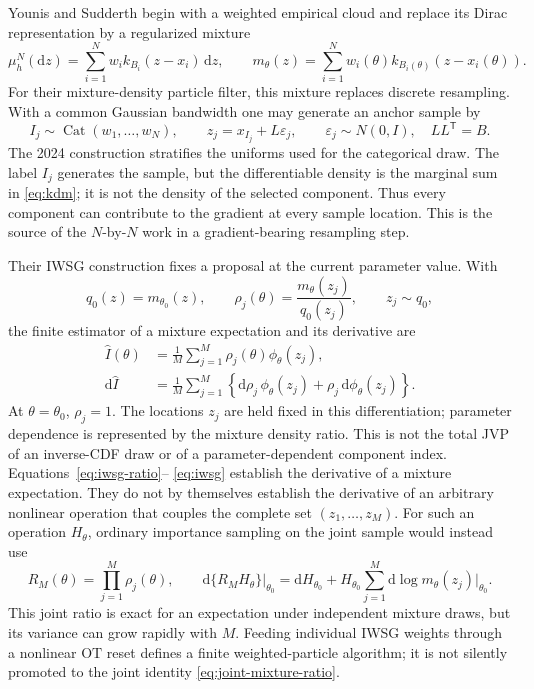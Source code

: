 \documentclass[11pt]{article}
\newcommand{\dd}{\mathrm{d}}
\newcommand{\OT}{\ensuremath{\mathrm{OT}}}
\begin{document}
Younis and Sudderth begin with a weighted empirical cloud and replace its
Dirac representation by a regularized mixture
\begin{equation}
 \mu_h^N(\dd z)
   = \sum_{i=1}^{N} w_i k_{B_i}(z-x_i)\,\dd z,
 \qquad
 m_\theta(z)=\sum_{i=1}^{N}
       w_i(\theta)k_{B_i(\theta)}(z-x_i(\theta)).
 \label{eq:kdm}
\end{equation}
For their mixture-density particle filter, this mixture replaces discrete
resampling.  With a common Gaussian bandwidth one may generate an anchor
sample by
\begin{equation}
 I_j\sim\operatorname{Cat}(w_1,\ldots,w_N),\qquad
 z_j=x_{I_j}+L\varepsilon_j,\qquad
 \varepsilon_j\sim N(0,I),\quad LL^\mathsf{T}=B.
 \label{eq:younis-sampling}
\end{equation}
The 2024 construction stratifies the uniforms used for the categorical draw.
The label $I_j$ generates the sample, but the differentiable density is the
marginal sum in \eqref{eq:kdm}; it is not the density of the selected
component.  Thus every component can contribute to the gradient at every
sample location.  This is the source of the $N$-by-$N$ work in a
gradient-bearing resampling step.

Their IWSG construction fixes a proposal at the current parameter value.  With
\begin{equation}
 q_0(z)=m_{\theta_0}(z),\qquad
 \rho_j(\theta)=\frac{m_\theta(z_j)}{q_0(z_j)},\qquad
 z_j\sim q_0,
 \label{eq:iwsg-ratio}
\end{equation}
the finite estimator of a mixture expectation and its derivative are
\begin{align}
 \widehat I(\theta)
   &=\frac{1}{M}\sum_{j=1}^{M}\rho_j(\theta)\phi_\theta(z_j),\\
 \dd\widehat I
   &=\frac{1}{M}\sum_{j=1}^{M}
       \left\{\dd\rho_j\,\phi_\theta(z_j)
              +\rho_j\,\dd\phi_\theta(z_j)\right\}.
 \label{eq:iwsg}
\end{align}
At $\theta=\theta_0$, $\rho_j=1$.  The locations $z_j$ are held fixed in
this differentiation; parameter dependence is represented by the mixture
density ratio.  This is not the total JVP of an inverse-CDF draw or of a
parameter-dependent component index.  Equations~\eqref{eq:iwsg-ratio}--
\eqref{eq:iwsg} establish the derivative of a mixture expectation.  They do
not by themselves establish the derivative of an arbitrary nonlinear
operation that couples the complete set $(z_1,\ldots,z_M)$.  For such an
operation $H_\theta$, ordinary importance sampling on the joint sample would
instead use
\begin{equation}
 R_M(\theta)=\prod_{j=1}^M\rho_j(\theta),\qquad
 \dd\{R_M H_\theta\}\big|_{\theta_0}
 =\dd H_{\theta_0}+H_{\theta_0}
   \sum_{j=1}^M\dd\log m_\theta(z_j)\big|_{\theta_0}.
 \label{eq:joint-mixture-ratio}
\end{equation}
This joint ratio is exact for an expectation under independent mixture draws,
but its variance can grow rapidly with $M$.  Feeding individual IWSG weights
through a nonlinear \OT{} reset defines a finite weighted-particle algorithm;
it is not silently promoted to the joint identity
\eqref{eq:joint-mixture-ratio}.
\end{document}
